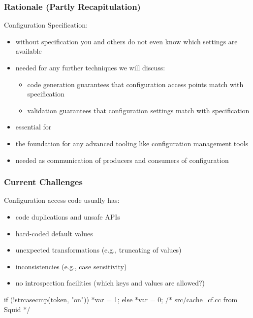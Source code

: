 \begin{frame}
	\frametitle{Rationale (Partly Recapitulation)}
	Configuration Specification:
	\begin{itemize}
	\item without specification you and others do not even know which settings are available
	\item needed for any further techniques we will discuss:
		\begin{itemize}
		\color{red}
		\item code generation guarantees that configuration access points match with specification
		\item validation guarantees that configuration settings match with specification
		\end{itemize}
	\item essential for ~\citet{holland2001nofutz}
	\item the foundation for any advanced tooling like configuration management tools
	\item needed as communication of producers and consumers of configuration
	\end{itemize}
\end{frame}

\begin{frame}[fragile]
	\frametitle{Current Challenges}
	Configuration access code usually has:
	\pause
	\begin{itemize}
	\item code duplications and unsafe APIs
	\item hard-coded default values
	\item unexpected transformations (e.g., truncating of values)
	\item inconsistencies (e.g., case sensitivity)
	\item no introspection facilities (which keys and values are allowed?)
	\end{itemize}
	\begin{example}
	\begin{code}[gobble=4,language=C++]
	if (!strcasecmp(token, "on")) {
		*var = 1;
	} else {
		*var = 0;
	} /* src/cache_cf.cc from Squid */
	\end{code}\end{example}
\end{frame}

